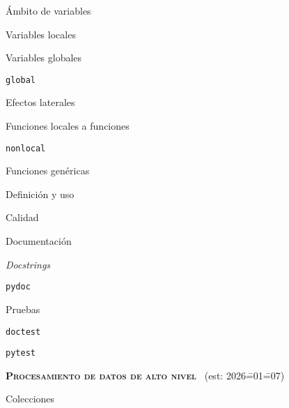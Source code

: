 \begin{longenum}
\begin{longenum}
        \begin{longenum}
            \item Ámbito de variables
            \begin{longenum}
                \item Variables locales
                \item Variables globales
                \begin{longenum}
                    \item \texttt{global}
                    \item Efectos laterales
                \end{longenum}
            \end{longenum}
            \item Funciones locales a funciones
            \begin{longenum}
                \item \texttt{nonlocal}
            \end{longenum}
        \end{longenum}
        \item Funciones genéricas
        \begin{longenum}
            \item Definición y uso
        \end{longenum}
        \item Calidad \opcional\
        \begin{longenum}
            \item Documentación
            \begin{longenum}
                \item \textit{Docstrings}
                \item \texttt{pydoc}
            \end{longenum}
            \item Pruebas
            \begin{longenum}
                \item \texttt{doctest}
                \item \texttt{pytest}
            \end{longenum}
        \end{longenum}
    \end{longenum}
    \item \textbf{\textsc{Procesamiento de datos de alto nivel}} \ev2\ (est: 2026\==01\==07)
    \begin{longenum}
        \item Colecciones

\end{longenum}
\end{longenum}
